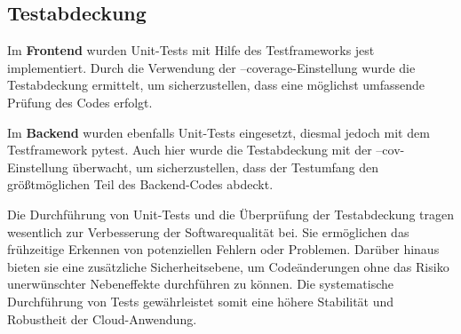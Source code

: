 \subsection{Testabdeckung}
Im \textbf{Frontend} wurden Unit-Tests mit Hilfe des Testframeworks \glqq{}jest\grqq{}\cite{jest} implementiert. Durch die Verwendung der \glqq{}--coverage\grqq{}-Einstellung wurde die Testabdeckung ermittelt, um sicherzustellen, dass eine möglichst umfassende Prüfung des Codes erfolgt.

Im \textbf{Backend} wurden ebenfalls Unit-Tests eingesetzt, diesmal jedoch mit dem Testframework \glqq{}pytest\grqq{}\cite{pytest}. Auch hier wurde die Testabdeckung mit der \glqq{}--cov\grqq{}-Einstellung überwacht, um sicherzustellen, dass der Testumfang den größtmöglichen Teil des Backend-Codes abdeckt.

Die Durchführung von Unit-Tests und die Überprüfung der Testabdeckung tragen wesentlich zur Verbesserung der Softwarequalität bei. Sie ermöglichen das frühzeitige Erkennen von potenziellen Fehlern oder Problemen. Darüber hinaus bieten sie eine zusätzliche Sicherheitsebene, um Codeänderungen ohne das Risiko unerwünschter Nebeneffekte durchführen zu können. Die systematische Durchführung von Tests gewährleistet somit eine höhere Stabilität und Robustheit der Cloud-Anwendung.
